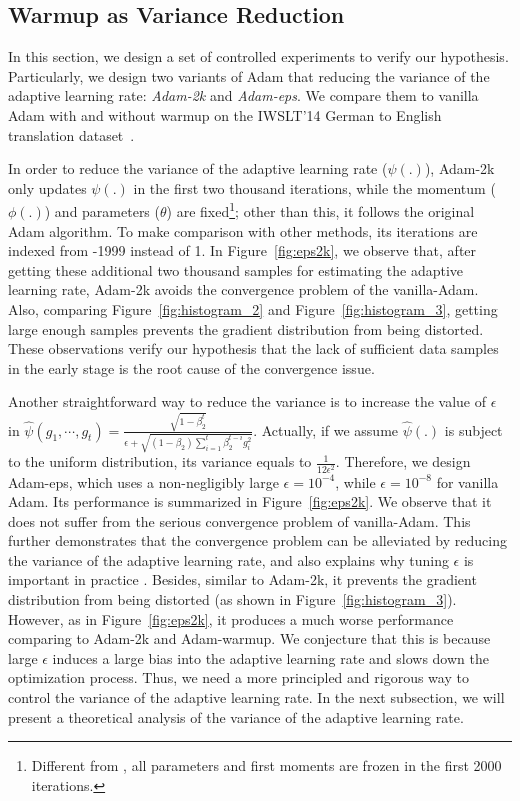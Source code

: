 \subsection{Warmup as Variance Reduction}
\vspace{-0.1cm}
In this section, we design a set of controlled experiments to verify our hypothesis. 
Particularly, we design two variants of Adam that reducing the variance of the adaptive learning rate: \textit{Adam-2k} and \textit{Adam-eps}. We compare them to vanilla Adam with and without warmup on the IWSLT'14 German to English translation dataset~\citep{cettolo2014report}. 

In order to reduce the variance of the adaptive learning rate ($\psi(.)$), Adam-2k only updates $\psi(.)$ in the first two thousand iterations, while the momentum ($\phi(.)$) and parameters ($\theta$) are fixed\footnote{Different from \cite{gotmare2018a}, all parameters and first moments are frozen in the first 2000 iterations.}; other than this, it follows the original Adam algorithm.
To make comparison with other methods, its iterations are indexed from -1999 instead of 1.
In Figure~\ref{fig:eps2k}, we observe that, after getting these additional two thousand samples for estimating the adaptive learning rate, Adam-2k avoids the convergence problem of the vanilla-Adam. 
Also, comparing Figure~\ref{fig:histogram_2} and Figure~\ref{fig:histogram_3}, getting large enough samples prevents the gradient distribution from being distorted. 
These observations verify our hypothesis that the lack of sufficient data samples in the early stage is the root cause of the convergence issue. 

Another straightforward way to reduce the variance is to increase the value of $\epsilon$ in $\hat{\psi}(g_1, \cdots, g_t) = \frac{\sqrt{1-\beta_2^t}}{\epsilon + \sqrt{(1 - \beta_2)\sum_{i = 1}^t \beta_2^{t-i}g_i^2}}$.
Actually, if we assume $\hat{\psi}(.)$ is subject to the uniform distribution, its variance equals to $\frac{1}{12 \epsilon^2}$.
Therefore, we design Adam-eps, which uses a non-negligibly large $\epsilon = 10^{-4}$, while $\epsilon = 10^{-8}$ for vanilla Adam.
Its performance is summarized in Figure~\ref{fig:eps2k}. 
We observe that it does not suffer from the serious convergence problem of vanilla-Adam. This further demonstrates that the convergence problem can be alleviated by reducing the variance of the adaptive learning rate, and also explains why tuning $\epsilon$ is important in practice \citep{liu2019roberta}. 
Besides, similar to Adam-2k, it prevents the gradient distribution from being distorted (as shown in Figure~\ref{fig:histogram_3}). 
However, as in Figure~\ref{fig:eps2k}, it produces a much worse performance comparing to Adam-2k and Adam-warmup. 
We conjecture that this is because large $\epsilon$ induces a large bias into the adaptive learning rate and slows down the optimization process. 
Thus, we need a more principled and rigorous way to control the variance of the adaptive learning rate. 
In the next subsection, we will present a theoretical analysis of the variance of the adaptive learning rate. 


